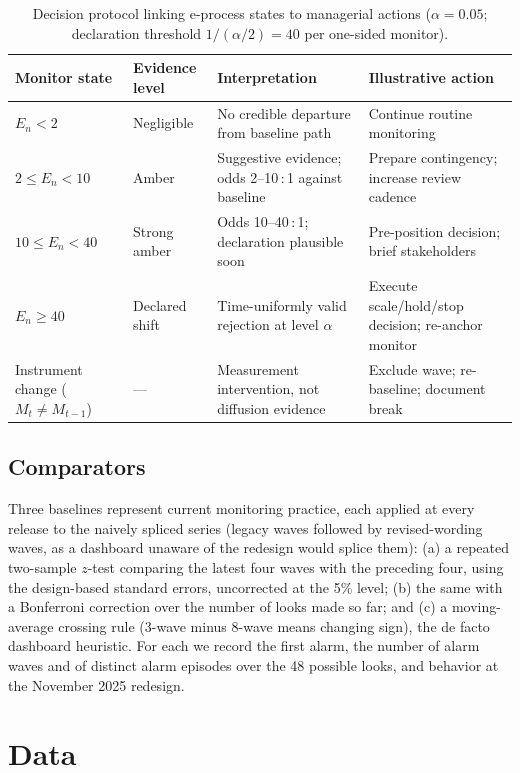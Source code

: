 \documentclass[review,authoryear,12pt]{elsarticle}
\begin{document}
\begin{table}[t]
\centering
\caption{Decision protocol linking e-process states to managerial actions ($\alpha = 0.05$; declaration threshold $1/(\alpha/2) = 40$ per one-sided monitor).}
\label{tab:protocol}
\small
\begin{tabular}{p{3.4cm}p{2.5cm}p{4.2cm}p{4.0cm}}
\toprule
Monitor state & Evidence level & Interpretation & Illustrative action \\
\midrule
$E_n < 2$ & Negligible & No credible departure from baseline path & Continue routine monitoring \\
$2 \le E_n < 10$ & Amber & Suggestive evidence; odds 2--10\,:\,1 against baseline & Prepare contingency; increase review cadence \\
$10 \le E_n < 40$ & Strong amber & Odds 10--40\,:\,1; declaration plausible soon & Pre-position decision; brief stakeholders \\
$E_n \ge 40$ & Declared shift & Time-uniformly valid rejection at level $\alpha$ & Execute scale/hold/stop decision; re-anchor monitor \\
Instrument change ($M_t \neq M_{t-1}$) & --- & Measurement intervention, not diffusion evidence & Exclude wave; re-baseline; document break \\
\bottomrule
\end{tabular}
\end{table}

\subsection{Comparators}
\label{sec:comparators}

Three baselines represent current monitoring practice, each applied at every release to the naively spliced series (legacy waves followed by revised-wording waves, as a dashboard unaware of the redesign would splice them): (a) a repeated two-sample $z$-test comparing the latest four waves with the preceding four, using the design-based standard errors, uncorrected at the 5\% level; (b) the same with a Bonferroni correction over the number of looks made so far; and (c) a moving-average crossing rule (3-wave minus 8-wave means changing sign), the de facto dashboard heuristic. For each we record the first alarm, the number of alarm waves and of distinct alarm episodes over the 48 possible looks, and behavior at the November 2025 redesign.

\section{Data}
\label{sec:data}
\end{document}

